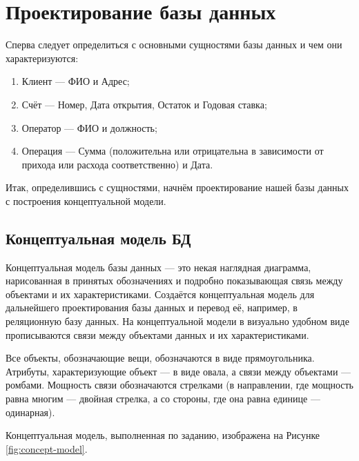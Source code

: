 \documentclass[14pt]{extarticle}
\begin{document}
    \newpage

    \section{Проектирование базы данных}

    Сперва следует определиться с основными сущностями базы данных и чем они характеризуются:
    \begin{enumerate}
        \item Клиент --- ФИО и Адрес;
        \item Счёт --- Номер, Дата открытия, Остаток и Годовая ставка;
        \item Оператор --- ФИО и должность;
        \item Операция --- Сумма (положительна или отрицательна в зависимости от прихода или расхода соответственно) и Дата.
    \end{enumerate}

    Итак, определившись с сущностями, начнём проектирование нашей базы данных с построения концептуальной модели.

    \newpage
    \subsection{Концептуальная модель БД}

    Концептуальная модель базы данных --- это некая наглядная диаграмма, нарисованная в принятых обозначениях и подробно показывающая связь между объектами и их характеристиками. Создаётся концептуальная модель для дальнейшего проектирования базы данных и перевод её, например, в реляционную базу данных. На концептуальной модели в визуально удобном виде прописываются связи между объектами данных и их характеристиками.

    Все объекты, обозначающие вещи, обозначаются в виде прямоугольника. Атрибуты, характеризующие объект --- в виде овала, а связи между объектами --- ромбами. Мощность связи обозначаются стрелками (в направлении, где мощность равна многим --- двойная стрелка, а со стороны, где она равна единице --- одинарная).

    Концептуальная модель, выполненная по заданию, изображена на Рисунке \ref{fig:concept-model}.

    \newpage
\end{document}
